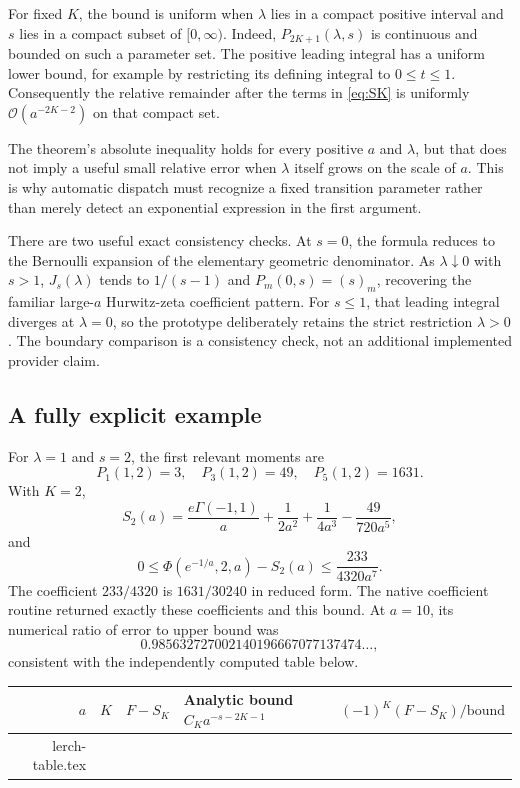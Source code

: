 \documentclass[11pt,a4paper]{article}
\makeatletter
\newcommand{\tableinput}[1]{\@@input #1 }
\newcommand{\OO}{\mathcal O}
\newcommand{\PhiL}{\Phi}
\makeatother
\begin{document}
For fixed $K$, the bound is uniform when $\lambda$ lies in a compact positive
interval and $s$ lies in a compact subset of $[0,\infty)$. Indeed,
$P_{2K+1}(\lambda,s)$ is continuous and bounded on such a parameter set.
The positive leading integral has a uniform lower bound, for example by
restricting its defining integral to $0\leq t\leq1$. Consequently the relative
remainder after the terms in \eqref{eq:SK} is uniformly
$\OO(a^{-2K-2})$ on that compact set.

The theorem's absolute inequality holds for every positive $a$ and
$\lambda$, but that does not imply a useful small relative error when
$\lambda$ itself grows on the scale of $a$. This is why automatic dispatch
must recognize a fixed transition parameter rather than merely detect an
exponential expression in the first argument.

There are two useful exact consistency checks. At $s=0$, the formula reduces
to the Bernoulli expansion of the elementary geometric denominator. As
$\lambda\downarrow0$ with $s>1$, $J_s(\lambda)$ tends to $1/(s-1)$ and
$P_m(0,s)=(s)_m$, recovering the familiar large-$a$ Hurwitz-zeta coefficient
pattern. For $s\leq1$, that leading integral diverges at $\lambda=0$, so the
prototype deliberately retains the strict restriction $\lambda>0$.
The boundary comparison is a consistency check, not an additional implemented
provider claim.

\subsection{A fully explicit example}

For $\lambda=1$ and $s=2$, the first relevant moments are
\[
 P_1(1,2)=3,\quad P_3(1,2)=49,\quad P_5(1,2)=1631.
\]
With $K=2$,
\begin{equation}
 S_2(a)=\frac{e\Gamma(-1,1)}a+\frac1{2a^2}
             +\frac1{4a^3}-\frac{49}{720a^5},
 \label{eq:example}
\end{equation}
 and
\begin{equation}
 0\leq\PhiL(e^{-1/a},2,a)-S_2(a)
 \leq\frac{233}{4320a^7}.
 \label{eq:example-bound}
\end{equation}
The coefficient $233/4320$ is $1631/30240$ in reduced form.
The native coefficient routine returned exactly these coefficients and this
bound. At $a=10$, its numerical ratio of error to upper bound was
\[
 0.985632727002140196667077137474\ldots,
\]
consistent with the independently computed table below.

\begin{center}
\small
\begin{tabular}{@{}rrlll@{}}
\toprule
$a$ & $K$ & $F-S_K$ & Analytic bound $C_Ka^{-s-2K-1}$ & $(-1)^K(F-S_K)/\text{bound}$\\
\midrule
\tableinput{lerch-table.tex}
\bottomrule
\end{tabular}
\end{center}
\end{document}
